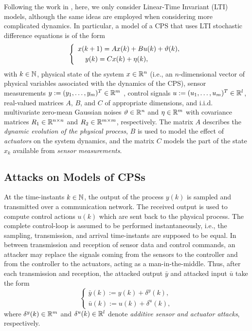 {Following the work in \cite{CPSAttacksAgainstPCS,Urbina2016,CPSDetectingIntegrityAttacksScada,CPSIntegrityAttacks,Carlos_Justin1,Carlos_Justin2,ReachableSets}, here, we only consider Linear-Time Invariant (LTI) models, although the same ideas are employed when considering more complicated dynamics. In particular, a model of a CPS that uses LTI stochastic difference equations is of the form
\begin{equation}
\left\{
\begin{array}{ll}
{x}({k+1}) = Ax(k) + B u(k) + \vartheta(k),  \label{1} \\[1mm]
\hspace{3.8mm} y(k) = Cx(k) + \eta(k),
\end{array}
\right.
\end{equation}
with $k\in \mathbb{N}$, physical state of the system $x \in \mathbb{R}^n$ (i.e., an $n$-dimensional vector of physical variables associated with the dynamics of the CPS), sensor measurements $y := (y_1,\ldots,y_m)^T \in \mathbb{R}^m$ , control signals $u := (u_1,\ldots,u_m)^T \in \mathbb{R}^l$, real-valued matrices $A$, $B$, and $C$ of appropriate dimensions, and i.i.d. multivariate zero-mean Gaussian noises $\vartheta \in \mathbb{R}^n$ and $\eta \in \mathbb{R}^m$ with covariance matrices $R_{1} \in \mathbb{R}^{n \times n}$ and $R_2 \in \mathbb{R}^{m \times m}$, respectively. The matrix $A$ describes the \emph{dynamic evolution of the physical process}, $B$ is used to model the effect of \emph{actuators} on the system dynamics, and the matrix $C$ models the part of the state $x_k$ available from \emph{sensor measurements}.

\subsection{Attacks on Models of CPSs}
\label{sec:AttacksOnModels} 
At the time-instants $k \in \mathbb{N}$, the output of the process $y(k)$ is sampled and transmitted over a communication network. The received output is used to compute control actions $u(k)$ which are sent back to the physical process. The complete control-loop is assumed to be performed instantaneously, i.e., the sampling, transmission, and arrival time-instants are supposed to be equal.
In between transmission and reception of sensor data and control commands, an attacker may replace the signals coming from the sensors to the controller and from the controller to the actuators, acting as a {man-in-the-middle}. Thus, after each transmission and reception, the attacked output $\bar{y}$ and attacked input $\bar{u}$ take the form
\begin{equation}
\left\{
\begin{array}{ll}
\bar{y}(k) := y(k) + \delta^y(k) 
, \label{3}\\[1mm]
\bar{u}(k) := u(k) + \delta^u(k),
\end{array}\right.
\end{equation}
where $\delta^y(k) \in \mathbb{R}^m$ and $\delta^u(k) \in \mathbb{R}^l$ denote \emph{additive sensor and actuator attacks}, respectively.

}

